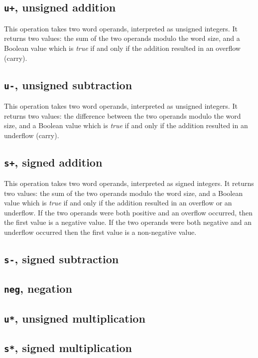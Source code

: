 \subsection{\texttt{u+}, unsigned addition}

This operation takes two word operands, interpreted as unsigned
integers.  It returns two values: the sum of the two operands modulo
the word size, and a Boolean value which is \emph{true} if and only if
the addition resulted in an overflow (carry).  

\subsection{\texttt{u-}, unsigned subtraction}

This operation takes two word operands, interpreted as unsigned
integers.  It returns two values: the difference between the two
operands modulo the word size, and a Boolean value which is
\emph{true} if and only if the addition resulted in an underflow
(carry).

\subsection{\texttt{s+}, signed addition}

This operation takes two word operands, interpreted as signed
integers.  It returns two values: the sum of the two operands modulo
the word size, and a Boolean value which is \emph{true} if and only if
the addition resulted in an overflow or an underflow.  If the two
operands were both positive and an overflow occurred, then the first
value is a negative value.  If the two operands were both negative and
an underflow occurred then the first value is a non-negative value. 

\subsection{\texttt{s-}, signed subtraction}
\subsection{\texttt{neg}, negation}
\subsection{\texttt{u*}, unsigned multiplication}
\subsection{\texttt{s*}, signed multiplication}

